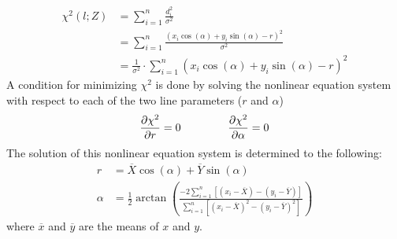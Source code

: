 \documentclass[../Head/Main.tex]{subfiles}
\begin{document}
\begin{align}
    \chi^2\left(l; Z\right) &= \sum_{i = 1}^{n} \frac{d_i^2}{\sigma^2} \\
    &= \sum_{i = 1}^{n}\frac{\left(x_i\cos(\alpha) + y_i\sin⁡(\alpha)-r\right)^2}{\sigma^2}\\
    &= \frac{1}{\sigma^2}\cdot\sum_{i = 1}^{n}\left(x_i\cos(\alpha) + y_i\sin⁡(\alpha)-r\right)^2
\end{align}
A condition for minimizing $\chi^2$ is done by solving the nonlinear equation system with respect to each of the two line parameters ($r$ and $\alpha$)
\begin{align}
    \frac{\partial\chi^2}{\partial r} = 0 \hspace{1.5cm} \frac{\partial\chi^2}{\partial\alpha} = 0
\end{align}
The solution of this nonlinear equation system is determined to the following:
\begin{align}
	r &= \overline{X}\cos(\alpha)+\overline{Y}\sin(\alpha) \\
    \alpha &= \frac{1}{2}\arctan\left(\frac{-2\sum_{i=1}^{n}\left[\left(x_i-\overline{X}\right) - \left(y_i-\overline{Y}\right)\right]}{\sum_{i = 1}^{n}\left[\left(x_i-\overline{X}\right)^2 - \left(y_i-\overline{Y}\right)^2\right]}\right)
\end{align}
where $\overline{x}$ and $\overline{y}$ are the means of $x$ and $y$.
\end{document}
